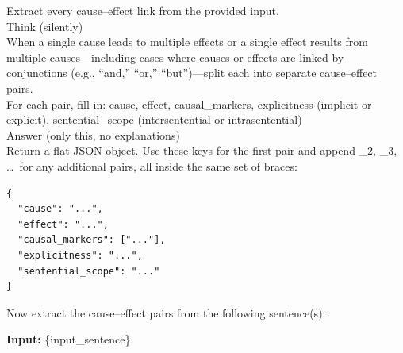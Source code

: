 \documentclass[conference]{IEEEtran}
\begin{document}
\begin{tcolorbox}[
  title=\textbf{3.  Experiment 2: Chain-of-thought Prompting},
  colback=gray!5,
  colframe=black!75,
  fonttitle=\bfseries,
  breakable
]
Extract every cause--effect link from the provided input.\\
Think (silently)\\
When a single cause leads to multiple effects or a single effect results from multiple causes---including cases where causes or effects are linked by conjunctions (e.g., ``and,'' ``or,'' ``but'')---split each into separate cause--effect pairs.\\
For each pair, fill in: cause, effect, causal\_markers, explicitness (implicit or explicit), sentential\_scope (intersentential or intrasentential)\\
Answer (only this, no explanations)\\
Return a flat JSON object. Use these keys for the first pair and append \_2, \_3, \dots\ for any additional pairs, all inside the same set of braces:
\begin{verbatim}
{
  "cause": "...",
  "effect": "...",
  "causal_markers": ["..."],
  "explicitness": "...",
  "sentential_scope": "..."
}
\end{verbatim}
Now extract the cause--effect pairs from the following sentence(s):

\textbf{Input:} \{input\_sentence\}
\end{tcolorbox}
\end{document}

